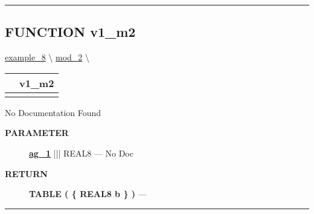\rule{\linewidth}{0.5pt}
\subsection*{\textsf{\colorbox{headtoc}{\color{white} FUNCTION}
v1\_m2}}

\hypertarget{ecldoc:intest.inintest.example_8.mod_2.v1_m2}{}
\hspace{0pt} \hyperlink{ecldoc:intest.inintest.example_8}{example_8} \textbackslash 
\hspace{0pt} \hyperlink{ecldoc:intest.inintest.example_8.mod_2}{mod_2} \textbackslash 

{\renewcommand{\arraystretch}{1.5}
\begin{tabularx}{\textwidth}{|>{\raggedright\arraybackslash}l|X|}
\hline
\hspace{0pt}\mytexttt{\color{red} } & \textbf{v1\_m2} \\
\hline
\multicolumn{2}{|>{\raggedright\arraybackslash}X|}{\hspace{0pt}\mytexttt{\color{param} (REAL8 ag\_1)}} \\
\hline
\end{tabularx}
}

\par





No Documentation Found






\par
\begin{description}
\item [\colorbox{tagtype}{\color{white} \textbf{\textsf{PARAMETER}}}] \textbf{\underline{ag\_1}} ||| REAL8 --- No Doc
\end{description}







\par
\begin{description}
\item [\colorbox{tagtype}{\color{white} \textbf{\textsf{RETURN}}}] \textbf{TABLE ( \{ REAL8 b \} )} --- 
\end{description}




\rule{\linewidth}{0.5pt}




